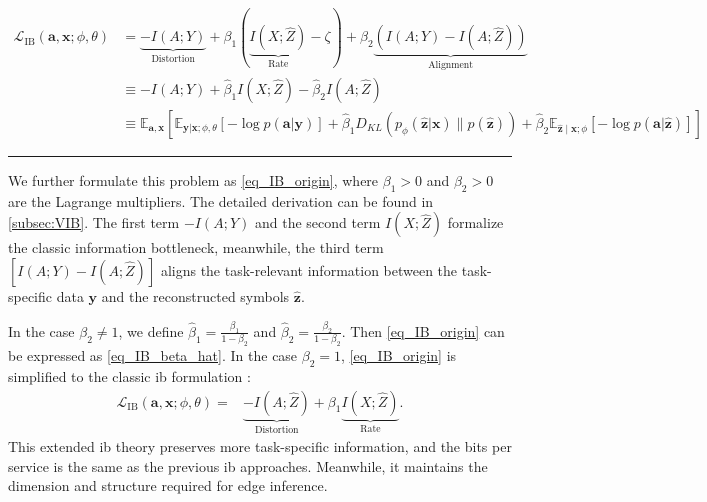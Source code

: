 \begin{figure*}
    \begin{subequations}
    \begin{align}
    \mathcal{L}_{\text{IB}}(\bm{a}, \bm{x}; \phi,\theta)&= \underbrace{-I(A;Y)}_{\text{Distortion}}
+\beta_1(\underbrace{I(X;\hat{Z})}_{\text{Rate}}-\zeta) +\beta_2\underbrace{(I(A;Y)-I(A;\hat{Z}))}_{\text{Alignment}} \label{eq_IB_origin}\\
&\equiv -I(A;Y) + \hat{\beta}_{1}I(X;\hat{Z})- \hat{\beta}_{2}I(A;\hat{Z}) \label{eq_IB_beta_hat}\\
&\equiv \mathbb{E}_{\bm{a}, \bm{x}}[\mathbb{E}_{\bm{y}|\bm{x};\phi,\theta}[-\log p(\bm{a}|\bm{y})]
+\hat{\beta}_{1} D_{K L}(p_{\phi}(\hat{\bm{z}} | \bm{x}) \| p(\hat{\bm{z}})) 
+\hat{\beta}_{2} \mathbb{E}_{\hat{\bm{z}} \mid \bm{x};\phi}[-\log p(\bm{a}|\hat{\bm{z}})]] \label{eq_IB_simplify}
    \end{align}
    \label{eq_IB}
    \end{subequations}
    {\noindent} \rule[0pt]{17.8cm}{0.05em}
\end{figure*}

We further formulate this problem as \cref{eq_IB_origin}, where $\beta_1 > 0$ and $\beta_2 > 0$ are the Lagrange multipliers. The detailed derivation can be found in \cref{subsec:VIB}.
The first term $-I(A;Y)$ and the second term $I(X;\hat{Z})$ formalize the classic information bottleneck, meanwhile, the third term $[I(A;Y)-I(A;\hat{Z})]$ aligns the task-relevant information between the task-specific data $\bm{y}$ and the reconstructed symbols $\hat{\bm{z}}$.

In the case $\beta_2 \neq 1$, we define $\hat{\beta}_{1} = \frac{\beta_1}{1-\beta_2}$ and $\hat{\beta}_{2} = \frac{\beta_2}{1-\beta_2}$. Then \cref{eq_IB_origin} can be expressed as \cref{eq_IB_beta_hat}. In the case $\beta_2 = 1$, \cref{eq_IB_origin} is simplified to the classic \gls{ib} formulation \cite{Tishby_1999_TIB, Alemi_2017_DVI, Shao_2022_LTO}:
\begin{align}
    \mathcal{L}_{\text{IB}}(\bm{a}, \bm{x}; \phi,\theta)=& \underbrace{-I(A;\hat{Z})}_{\text{Distortion}}
+\beta_1\underbrace{I(X;\hat{Z})}_{\text{Rate}}. 
\end{align}
This extended \gls{ib} theory preserves more task-specific information, and the bits per service is the same as the previous \gls{ib} approaches. Meanwhile, it maintains the dimension and structure required for edge inference.

